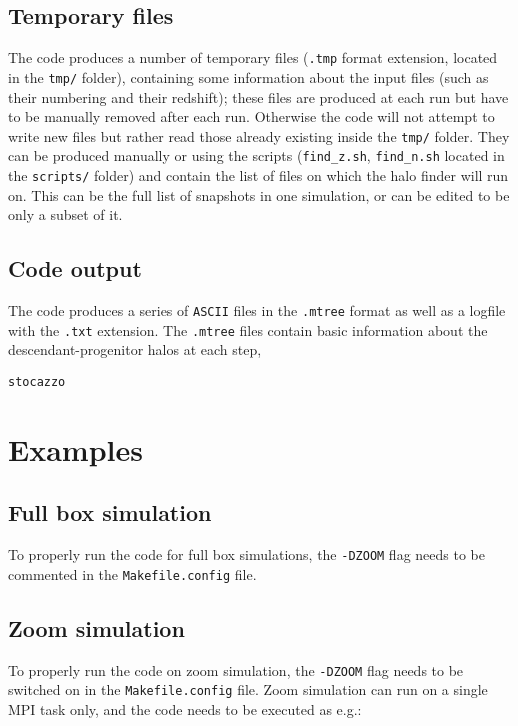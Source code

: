 \documentclass{article}
\begin{document}
\subsection{Temporary files}

The code produces a number of temporary files (\texttt{.tmp} format extension, located in the \texttt{tmp/} folder), containing
some information about the input files (such as their numbering and their redshift); these files are produced at each run but have
to be manually removed after each run. Otherwise the code will not attempt to write new files but rather read those already existing
inside the \texttt{tmp/} folder.
They can be produced manually or using the scripts (\texttt{find\_z.sh}, \texttt{find\_n.sh} located in the \texttt{scripts/} folder)
and contain the list of files on which the halo finder will run on.
This can be the full list of snapshots in one simulation, or can be edited to be only a subset of it.

\subsection{Code output}
The code produces a series of \texttt{ASCII} files in the \texttt{.mtree} format 
as well as a logfile with the \texttt{.txt} extension.
The \texttt{.mtree} files contain basic information about the descendant-progenitor halos at each step,

\begin{verbatim}
stocazzo
\end{verbatim}


\section{Examples}

\subsection{Full box simulation}
To properly run the code for full box simulations, the \texttt{-DZOOM} flag needs to be commented in the \texttt{Makefile.config} file.



\subsection{Zoom simulation}
To properly run the code on zoom simulation, the \texttt{-DZOOM} flag needs to be switched on in the \texttt{Makefile.config} file.
Zoom simulation can run on a single MPI task only, and the code needs to be executed as e.g.:\\
\end{document}
